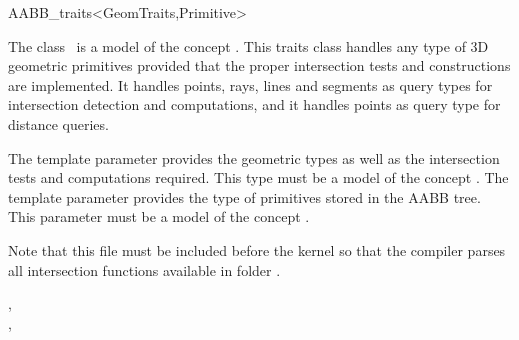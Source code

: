 \ccRefPageBegin


\begin{ccRefClass}{AABB_traits<GeomTraits,Primitive>}


\ccDefinition
  
The class \ccRefName\ is a model of the concept . This traits class handles any type of 3D geometric primitives provided that the proper intersection tests and constructions are implemented. It handles points, rays, lines and segments as query types for intersection detection and computations, and it handles points as query type for distance queries. 

\ccParameters
The template parameter  provides the geometric types as well as the intersection tests and computations required. This type must be a model of the concept . The template parameter  provides the type of primitives stored in the AABB tree. This parameter must be a model of the concept .

Note that this file must be included before the kernel so that the compiler parses all intersection functions available in folder .

\ccTypes

\ccGlue
{}
\ccGlue
{}
\ccGlue
{}
\ccGlue
{}

{} 


\ccSeeAlso

,\\
, \\
\\


\end{ccRefClass}

\ccRefPageEnd

